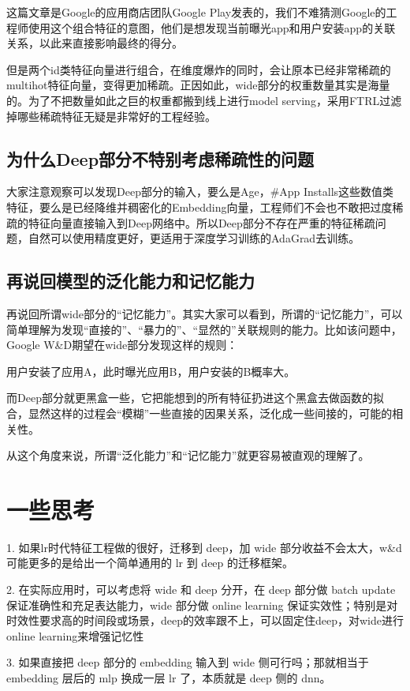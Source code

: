 \documentclass[12pt]{article}
\begin{document}
这篇文章是Google的应用商店团队Google Play发表的，我们不难猜测Google的工程师使用这个组合特征的意图，他们是想发现当前曝光app和用户安装app的关联关系，以此来直接影响最终的得分。

但是两个id类特征向量进行组合，在维度爆炸的同时，会让原本已经非常稀疏的multihot特征向量，变得更加稀疏。正因如此，wide部分的权重数量其实是海量的。为了不把数量如此之巨的权重都搬到线上进行model serving，采用FTRL过滤掉哪些稀疏特征无疑是非常好的工程经验。

\subsection{为什么Deep部分不特别考虑稀疏性的问题}
大家注意观察可以发现Deep部分的输入，要么是Age，\#App Installs这些数值类特征，要么是已经降维并稠密化的Embedding向量，工程师们不会也不敢把过度稀疏的特征向量直接输入到Deep网络中。所以Deep部分不存在严重的特征稀疏问题，自然可以使用精度更好，更适用于深度学习训练的AdaGrad去训练。

\subsection{再说回模型的泛化能力和记忆能力}
再说回所谓wide部分的“记忆能力”。其实大家可以看到，所谓的“记忆能力”，可以简单理解为发现“直接的”、“暴力的”、“显然的”关联规则的能力。比如该问题中，Google W\&D期望在wide部分发现这样的规则：

用户安装了应用A，此时曝光应用B，用户安装的B概率大。

而Deep部分就更黑盒一些，它把能想到的所有特征扔进这个黑盒去做函数的拟合，显然这样的过程会“模糊”一些直接的因果关系，泛化成一些间接的，可能的相关性。

从这个角度来说，所谓“泛化能力”和“记忆能力”就更容易被直观的理解了。

\section{一些思考}
1. 如果lr时代特征工程做的很好，迁移到 deep，加 wide 部分收益不会太大，w\&d 可能更多的是给出一个简单通用的 lr 到 deep 的迁移框架。

2. 在实际应用时，可以考虑将 wide 和 deep 分开，在 deep 部分做 batch update 保证准确性和充足表达能力，wide 部分做 online learning 保证实效性；特别是对时效性要求高的时间段或场景，deep的效率跟不上，可以固定住deep，对wide进行online learning来增强记忆性

3. 如果直接把 deep 部分的 embedding 输入到 wide 侧可行吗；那就相当于 embedding 层后的 mlp 换成一层 lr 了，本质就是 deep 侧的 dnn。



\end{document}
